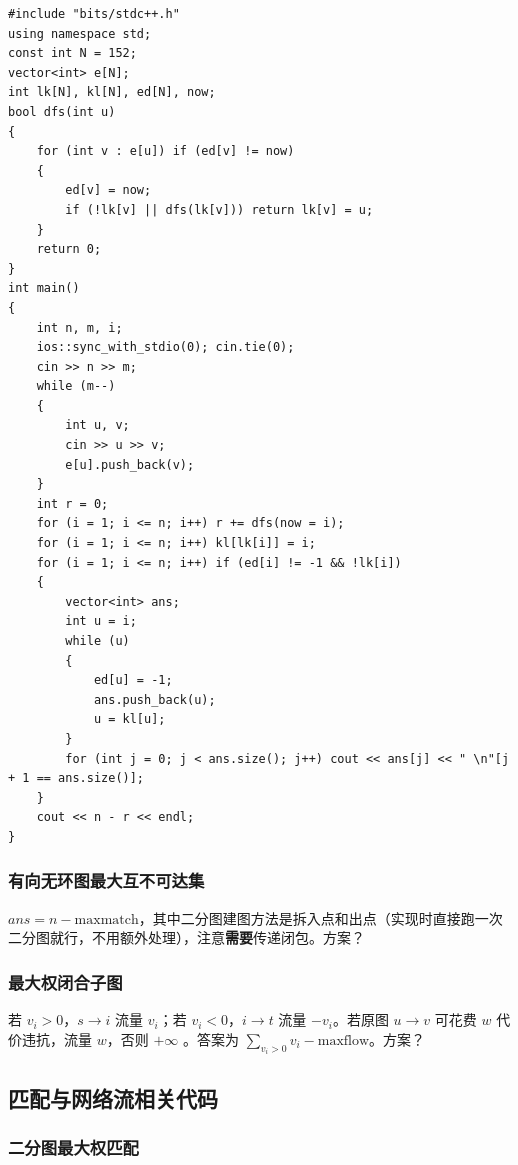 \documentclass[12pt]{ctexart}
\begin{document}
\begin{lstlisting}
#include "bits/stdc++.h"
using namespace std;
const int N = 152;
vector<int> e[N];
int lk[N], kl[N], ed[N], now;
bool dfs(int u)
{
	for (int v : e[u]) if (ed[v] != now)
	{
		ed[v] = now;
		if (!lk[v] || dfs(lk[v])) return lk[v] = u;
	}
	return 0;
}
int main()
{
	int n, m, i;
	ios::sync_with_stdio(0); cin.tie(0);
	cin >> n >> m;
	while (m--)
	{
		int u, v;
		cin >> u >> v;
		e[u].push_back(v);
	}
	int r = 0;
	for (i = 1; i <= n; i++) r += dfs(now = i);
	for (i = 1; i <= n; i++) kl[lk[i]] = i;
	for (i = 1; i <= n; i++) if (ed[i] != -1 && !lk[i])
	{
		vector<int> ans;
		int u = i;
		while (u)
		{
			ed[u] = -1;
			ans.push_back(u);
			u = kl[u];
		}
		for (int j = 0; j < ans.size(); j++) cout << ans[j] << " \n"[j + 1 == ans.size()];
	}
	cout << n - r << endl;
}
\end{lstlisting}

\subsubsection{有向无环图最大互不可达集}

$ans=n-\text{maxmatch}$，其中二分图建图方法是拆入点和出点（实现时直接跑一次二分图就行，不用额外处理），注意\textbf{需要}传递闭包。方案？

\subsubsection{最大权闭合子图}

若 $v_i>0$，$s\to i$ 流量 $v_i$；若 $v_i<0$，$i\to t$ 流量 $-v_i$。若原图 $u\to v$ 可花费 $w$ 代价违抗，流量 $w$，否则 $+\infty$ 。答案为 $\sum\limits_{v_i>0} v_i-\text{maxflow}$。方案？

\subsection{匹配与网络流相关代码}

\subsubsection{二分图最大权匹配}
\end{document}
